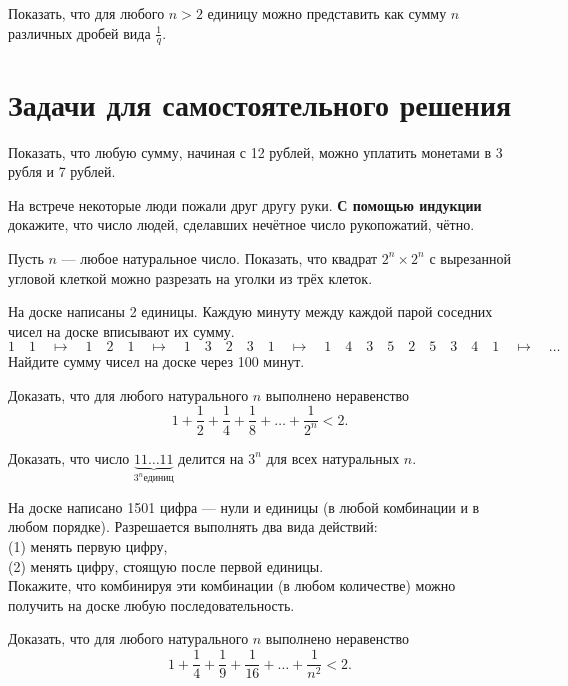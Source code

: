 \documentclass[a4paper,12pt]{article}
\begin{document}
    \problem Показать, что для любого $n > 2$ единицу можно представить как сумму $n$ различных дробей вида $\frac{1}{q}$.
    
    \section{Задачи для самостоятельного решения}
    
    \problem Показать, что любую сумму, начиная с 12 рублей, можно уплатить монетами в 3 рубля и 7 рублей.
    
    \problem На встрече некоторые люди пожали друг другу руки. \textbf{С помощью индукции} докажите, что число людей, сделавших нечётное число рукопожатий, чётно.
    
    \problem Пусть $n$ --- любое натуральное число. Показать, что квадрат $2^n \times 2^n$ с вырезанной угловой клеткой можно разрезать на уголки из трёх клеток.
    
    \problem На доске написаны 2 единицы. Каждую минуту между каждой парой соседних чисел на доске вписывают их сумму. 
    \begin{equation*}
        1\quad1 \quad\mapsto\quad 1\quad2\quad1 \quad\mapsto\quad 1\quad3\quad2\quad3\quad1 \quad\mapsto\quad 1\quad4\quad3\quad5\quad2\quad5\quad3\quad4\quad1 \quad\mapsto\quad \ldots
    \end{equation*}
    Найдите сумму чисел на доске через 100 минут.
    
    \problem Доказать, что для любого натурального $n$ выполнено неравенство
    \begin{equation*}
        1 + \frac{1}{2} + \frac{1}{4} + \frac{1}{8} + \ldots + \frac{1}{2^n} < 2.
    \end{equation*}
    
     Доказать, что число $\underbrace{11 \ldots 11}_{3^n \text{единиц}}$ делится на $3^n$ для всех натуральных $n$.
    
     На доске написано 1501 цифра --- нули и единицы (в любой комбинации и в любом порядке). Разрешается выполнять два вида действий:\\
    (1) менять первую цифру,\\
    (2) менять цифру, стоящую после первой единицы.\\
    Покажите, что комбинируя эти комбинации (в любом количестве) можно получить на доске любую последовательность.
    
     Доказать, что для любого натурального $n$ выполнено неравенство
    \begin{equation*}
        1 + \frac{1}{4} + \frac{1}{9} + \frac{1}{16} + \ldots + \frac{1}{n^2} < 2.
    \end{equation*}
    
\end{document}
